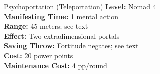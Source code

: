 {Psychoportation (Teleportation)}
{
	\textbf{Level:}
	Nomad 4\\
	\textbf{Manifesting Time:}
	1 mental action\\
	\textbf{Range:}
	45 meters; see text\\
	\textbf{Effect:}
	Two extradimensional portals\\
	\textbf{Saving Throw:}
	Fortitude negates; see text\\
	\textbf{Cost:}
	20 power points\\
	\textbf{Maintenance Cost:}
	4 pp/round\\
}
